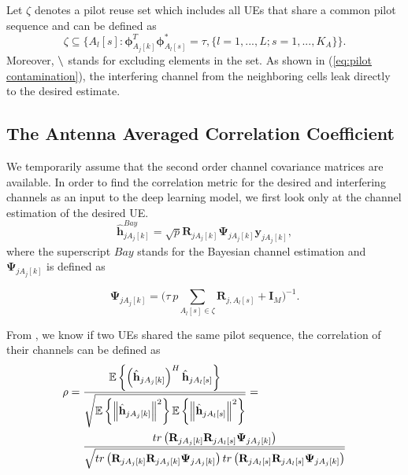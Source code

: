 Let $\zeta$ denotes a pilot reuse set which includes all UEs that share a common pilot sequence and can be defined as
\begin{equation}
\zeta \subseteq \{A_l[s]:\mathbf{\phi}_{A_j[k]}^T \mathbf{\phi}_{A_l[s]}^*=\tau, \{l=1,...,L;s=1,...,K_A\}\}.
\end{equation}
Moreover, $\char`\\$ stands for excluding elements in the set. As shown in (\ref{eq:pilot contamination}), the interfering channel from the neighboring cells leak directly to the desired estimate.

\subsection{The Antenna Averaged Correlation Coefficient}
We temporarily assume that the second order channel covariance matrices are available. 
In order to find the correlation metric for the desired and interfering channels as an input to the deep learning model, we first look only at the channel estimation of the desired UE.
\begin{equation}
\hat{\mathbf{h}}^{Bay}_{jA_j[k]} = \sqrt{p}\mathbf{R}_{jA_j[k]} \mathbf{\Psi}_{jA_j[k]} \mathbf{y}_{jA_j[k]}, 
\end{equation}
where the superscript $Bay$ stands for the Bayesian channel estimation %
and $\mathbf{\Psi}_{jA_j[k]}$ is defined as


\begin{equation}
\mathbf{\Psi}_{jA_j[k]} = \Bigg(\tau\:{p}\sum_{A_l[s]\in\zeta} \mathbf{R}_{j,A_l[s]} + \mathbf{I}_M\Bigg)^{-1}.
\label{eq:psi_function}
\end{equation}

From \cite{bjornson2017massive}, we know if two UEs shared the same pilot sequence, the correlation of their channels can be defined as
\begin{equation}
\begin{split}
\rho={} &
\frac{\operatorname{\mathbb{E}}\left\{ \left(\hat{\mathbf{h}}_{jA_{j}[k]}\right)^{H}\hat{\mathbf{h}}_{jA_{l}[s]}\right\} }{\sqrt{\operatorname{\mathbb{E}}\left\{ \left\Vert \hat{\mathbf{h}}_{jA_{j}[k]}\right\Vert ^{2}\right\} \operatorname{\mathbb{E}}\left\{ \left\Vert \hat{\mathbf{h}}_{jA_{l}[s]}\right\Vert ^{2}\right\} }}=\\
& \frac{tr\left(\mathbf{R}_{jA_{j}[k]}\mathbf{R}_{jA_{l}[s]}\mathbf{\Psi}_{jA_{j}[k]}\right)}{\sqrt{tr\left(\mathbf{R}_{jA_{j}[k]}\mathbf{R}_{jA_{j}[k]}\mathbf{\Psi}_{jA_{j}[k]}\right)tr\left(\mathbf{R}_{jA_{l}[s]}\mathbf{R}_{jA_{l}[s]}\mathbf{\Psi}_{jA_{j}[k]}\right)}}
\end{split}
\end{equation}

